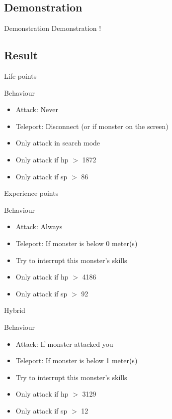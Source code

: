 \subsection{Demonstration}

\begin{frame}{Demonstration}
  Demonstration !
\end{frame}

\subsection{Result}

\begin{frame}{Life points}
	\begin{block}{Behaviour}
		\begin{itemize}
			\item Attack: Never
			\item Teleport: Disconnect (or if monster on the screen)
			\item Only attack in search mode
			\item Only attack if hp $>$ 1872
			\item Only attack if sp $>$ 86
		\end{itemize}
	\end{block}
\end{frame}

\begin{frame}{Experience points}	
	\begin{block}{Behaviour}
		\begin{itemize}
			\item Attack: Always
			\item Teleport: If monster is below 0 meter(s)
			\item Try to interrupt this monster's skills
			\item Only attack if hp $>$ 4186
			\item Only attack if sp $>$ 92
		\end{itemize}
	\end{block}
\end{frame}

\begin{frame}{Hybrid}
	\begin{block}{Behaviour}
		\begin{itemize}
			\item Attack: If monster attacked you
			\item Teleport: If monster is below 1 meter(s)
			\item Try to interrupt this monster's skills
			\item Only attack if hp $>$ 3129
			\item Only attack if sp $>$ 12
		\end{itemize}
	\end{block}
\end{frame}
